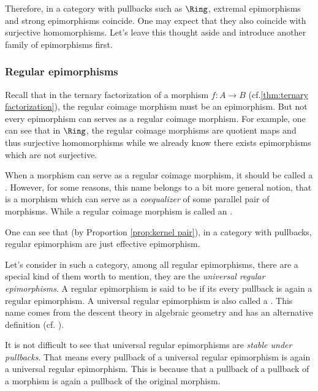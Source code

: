   Therefore, in a category with pullbacks such as $\Ring$, extremal epimorphisms and strong epimorphisms coincide. One may expect that they also coincide with surjective homomorphisms. Let's leave this thought aside and introduce another family of epimorphisms first.

\subsubsection{Regular epimorphisms}
  Recall that in the ternary factorization of a morphism $f\colon A\to B$ (cf.\ref{thm:ternary factorization}), the regular coimage morphism must be an epimorphism. But not every epimorphism can serves as a regular coimage morphism. For example, one can see that in $\Ring$, the regular coimage morphisms are quotient maps and thus surjective homomorphisms while we already know there exists epimorphisms which are not surjective.

  When a morphism can serve as a regular coimage morphism, it should be called a . However, for some reasons, this name belongs to a bit more general notion, that is a morphism which can serve as a \emph{coequalizer} of some parallel pair of morphisms. While a regular coimage morphism is called an .

  One can see that (by Proportion \ref{prop:kernel pair}), in a category with pullbacks, regular epimorphism are just effective epimorphism.

  Let's consider in such a category, among all regular epimorphisms, there are a special kind of them worth to mention, they are the \emph{universal regular epimorphisms}. A regular epimorphism is said to be  if its every pullback is again a regular epimorphism.
  A universal regular epimorphism is also called a . This name comes from the descent theory in algebraic geometry and has an alternative definition (cf. \cite{Vistoli}).


  It is not difficult to see that universal regular epimorphisms are \emph{stable under pullbacks}. That means every pullback of a universal regular epimorphism is again a universal regular epimorphism. This is because that a pullback of a pullback of a morphism is again a pullback of the original morphism.

